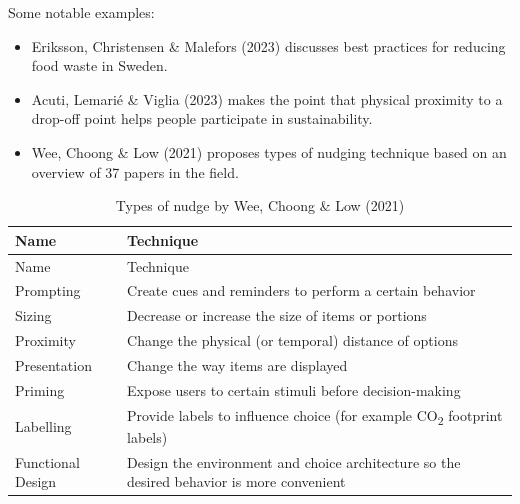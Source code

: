 \documentclass[
  letterpaper,
  DIV=11,
  numbers=noendperiod]{scrartcl}
\providecommand{\tightlist}{%
  \setlength{\itemsep}{0pt}\setlength{\parskip}{0pt}}\usepackage{longtable,booktabs,array}
\begin{document}
Some notable examples:

\begin{itemize}
\tightlist
\item
  Eriksson, Christensen \& Malefors (2023) discusses best practices for
  reducing food waste in Sweden.
\item
  Acuti, Lemarié \& Viglia (2023) makes the point that physical
  proximity to a drop-off point helps people participate in
  sustainability.
\item
  Wee, Choong \& Low (2021) proposes types of nudging technique based on
  an overview of 37 papers in the field.
\end{itemize}

\begin{longtable}[]{@{}
  >{\raggedright\arraybackslash}p{}
  >{\raggedright\arraybackslash}p{}@{}}
\caption{Types of nudge by Wee, Choong \& Low (2021)}\tabularnewline
\toprule\noalign{}
\begin{minipage}[b]{\linewidth}\raggedright
Name
\end{minipage} & \begin{minipage}[b]{\linewidth}\raggedright
Technique
\end{minipage} \\
\midrule\noalign{}
\endfirsthead
\toprule\noalign{}
\begin{minipage}[b]{\linewidth}\raggedright
Name
\end{minipage} & \begin{minipage}[b]{\linewidth}\raggedright
Technique
\end{minipage} \\
\midrule\noalign{}
\endhead
\bottomrule\noalign{}
\endlastfoot
Prompting & Create cues and reminders to perform a certain behavior \\
Sizing & Decrease or increase the size of items or portions \\
Proximity & Change the physical (or temporal) distance of options \\
Presentation & Change the way items are displayed \\
Priming & Expose users to certain stimuli before decision-making \\
Labelling & Provide labels to influence choice (for example
CO\textsubscript{2} footprint labels) \\
Functional Design & Design the environment and choice architecture so
the desired behavior is more convenient \\
\end{longtable}
\end{document}
